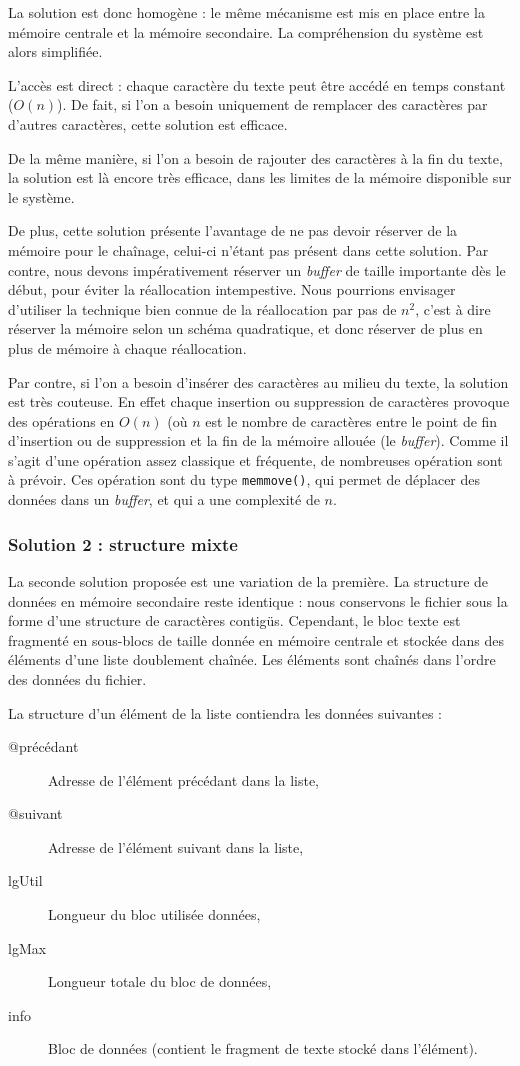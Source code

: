 La solution est donc homogène : le même mécanisme est mis en place entre la
mémoire centrale et la mémoire secondaire. La compréhension du système est
alors simplifiée.

L'accès est direct : chaque caractère du texte peut être accédé en temps
constant ($O(n)$). De fait, si l'on a besoin uniquement de remplacer des
caractères par d'autres caractères, cette solution est efficace.

De la même manière, si l'on a besoin de rajouter des caractères à la fin du
texte, la solution est là encore très efficace, dans les limites de la mémoire
disponible sur le système.

De plus, cette solution présente l'avantage de ne pas devoir réserver de la
mémoire pour le chaînage, celui-ci n'étant pas présent dans cette solution.
Par contre, nous devons impérativement réserver un \emph{buffer} de taille
importante dès le début, pour éviter la réallocation intempestive. Nous
pourrions envisager d'utiliser la technique bien connue de la réallocation par
pas de $n^2$, c'est à dire réserver la mémoire selon un schéma quadratique, et
donc réserver de plus en plus de mémoire à chaque réallocation.

Par contre, si l'on a besoin d'insérer des caractères au milieu du texte, la
solution est très couteuse. En effet chaque insertion ou suppression de
caractères provoque des opérations en $O(n)$ (où $n$ est le nombre de
caractères entre le point de fin d'insertion ou de suppression et la fin de la
mémoire allouée (le \emph{buffer}). Comme il s'agit d'une opération assez
classique et fréquente, de nombreuses opération sont à prévoir.  Ces opération
sont du type \texttt{memmove()}, qui permet de déplacer des données dans un
\emph{buffer}, et qui a une complexité de $n$.

\subsubsection{Solution 2 : structure mixte}
La seconde solution proposée est une variation de la première. La structure de
données en mémoire secondaire reste identique : nous conservons le fichier sous
la forme d'une structure de caractères contigüs. Cependant, le bloc texte est
fragmenté en sous-blocs de taille donnée en mémoire centrale et stockée dans
des éléments d'une liste doublement chaînée. Les éléments sont chaînés dans
l'ordre des données du fichier.

La structure d'un élément de la liste contiendra les données suivantes :
\begin{description}
  \item[@précédant] Adresse de l'élément précédant dans la liste,
  \item[@suivant] Adresse de l'élément suivant dans la liste,
  \item[lgUtil] Longueur du bloc utilisée données,
  \item[lgMax] Longueur totale du bloc de données,
  \item[info] Bloc de données (contient le fragment de texte stocké dans
l'élément).
\end{description}

